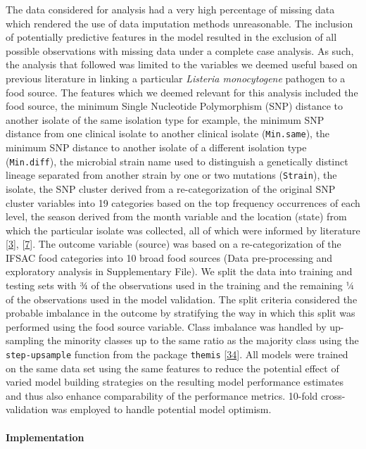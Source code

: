 \documentclass[
  10pt,
]{article}
\begin{document}
The data considered for analysis had a very high percentage of missing data which rendered the use of data imputation methods unreasonable. The inclusion of potentially predictive features in the model resulted in the exclusion of all possible observations with missing data under a complete case analysis. As such, the analysis that followed was limited to the variables we deemed useful based on previous literature in linking a particular \emph{Listeria monocytogene} pathogen to a food source. The features which we deemed relevant for this analysis included the food source, the minimum Single Nucleotide Polymorphism (SNP) distance to another isolate of the same isolation type for example, the minimum SNP distance from one clinical isolate to another clinical isolate (\texttt{Min.same}), the minimum SNP distance to another isolate of a different isolation type (\texttt{Min.diff}), the microbial strain name used to distinguish a genetically distinct lineage separated from another strain by one or two mutations (\texttt{Strain}), the isolate, the SNP cluster derived from a re-categorization of the original SNP cluster variables into 19 categories based on the top frequency occurrences of each level, the season derived from the month variable and the location (state) from which the particular isolate was collected, all of which were informed by literature {[}\protect\hyperlink{ref-tanui2022machine}{3}{]}, {[}\protect\hyperlink{ref-filipello2020attribution}{7}{]}. The outcome variable (source) was based on a re-categorization of the IFSAC food categories into 10 broad food sources (Data pre-processing and exploratory analysis in Supplementary File). We split the data into training and testing sets with ¾ of the observations used in the training and the remaining ¼ of the observations used in the model validation. The split criteria considered the probable imbalance in the outcome by stratifying the way in which this split was performed using the food source variable. Class imbalance was handled by up-sampling the minority classes up to the same ratio as the majority class using the \texttt{step-upsample} function from the package \texttt{themis} {[}\protect\hyperlink{ref-Hvitfeldt2022}{34}{]}. All models were trained on the same data set using the same features to reduce the potential effect of varied model building strategies on the resulting model performance estimates and thus also enhance comparability of the performance metrics. 10-fold cross-validation was employed to handle potential model optimism.

\hypertarget{implementation}{%
\paragraph{Implementation}\label{implementation}}
\end{document}
